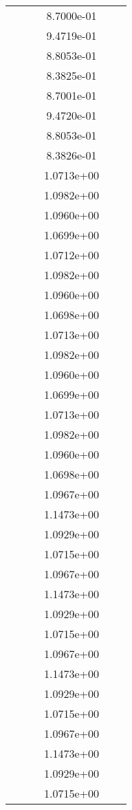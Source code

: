 \begin{xltabular}{\textwidth}{r|rS[table-format=1.3e+2]S[table-format=1.4e+2]S[table-format=1.4e+2]S[table-format=-1.5]}
&  &  & 8.7000e-01 & & \\
&  &  & 9.4719e-01 & & \\
&  &  & 8.8053e-01 & & \\
&  &  & 8.3825e-01 & & \\
&  &  & 8.7001e-01 & & \\
&  &  & 9.4720e-01 & & \\
&  &  & 8.8053e-01 & & \\
&  &  & 8.3826e-01 & & \\
&  &  & 1.0713e+00 & & \\
&  &  & 1.0982e+00 & & \\
&  &  & 1.0960e+00 & & \\
&  &  & 1.0699e+00 & & \\
&  &  & 1.0712e+00 & & \\
&  &  & 1.0982e+00 & & \\
&  &  & 1.0960e+00 & & \\
&  &  & 1.0698e+00 & & \\
&  &  & 1.0713e+00 & & \\
&  &  & 1.0982e+00 & & \\
&  &  & 1.0960e+00 & & \\
&  &  & 1.0699e+00 & & \\
&  &  & 1.0713e+00 & & \\
&  &  & 1.0982e+00 & & \\
&  &  & 1.0960e+00 & & \\
&  &  & 1.0698e+00 & & \\
&  &  & 1.0967e+00 & & \\
&  &  & 1.1473e+00 & & \\
&  &  & 1.0929e+00 & & \\
&  &  & 1.0715e+00 & & \\
&  &  & 1.0967e+00 & & \\
&  &  & 1.1473e+00 & & \\
&  &  & 1.0929e+00 & & \\
&  &  & 1.0715e+00 & & \\
&  &  & 1.0967e+00 & & \\
&  &  & 1.1473e+00 & & \\
&  &  & 1.0929e+00 & & \\
&  &  & 1.0715e+00 & & \\
&  &  & 1.0967e+00 & & \\
&  &  & 1.1473e+00 & & \\
&  &  & 1.0929e+00 & & \\
&  &  & 1.0715e+00 & & \\

\end{xltabular}
